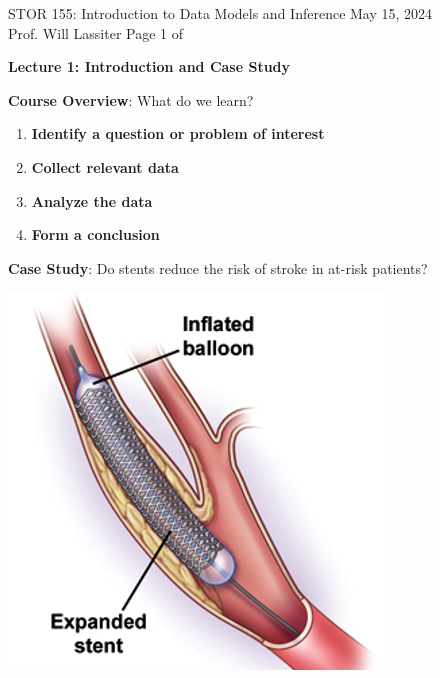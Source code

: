 \documentclass[11pt,letterpaper,twoside]{article}
\newcommand{\whatizit}{Lecture 1: Introduction and Case Study}
\begin{document}
\thispagestyle{empty} \vspace*{-0.75in}

{\bssten STOR 155: Introduction to Data Models and Inference \hfill May 15, 2024 \\
Prof. Will Lassiter  \hfill Page 1 of \pageref{totalpag}}
\vspace{10pt}
\begin{center} {{\Large \bf \whatizit}} \end{center}

{\bf Course Overview}: What do we learn?

\begin{enumerate}

\item {\bf Identify a question or problem of interest} \vspace{50pt}

\item {\bf Collect relevant data} \vspace{50pt}

\item {\bf Analyze the data} \vspace{50pt}

\item {\bf Form a conclusion} \vspace{50pt}

\end{enumerate}

{\bf Case Study}: Do stents reduce the risk of stroke in at-risk patients?

\begin{center}
\includegraphics[scale=1]{stent.png}
\end{center}
\end{document}
